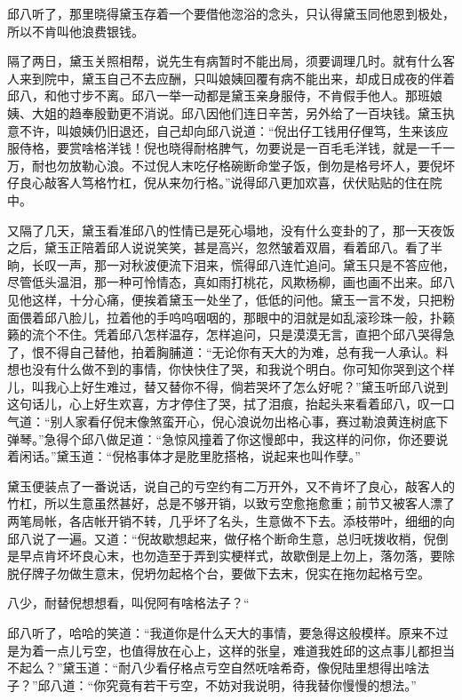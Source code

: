 \documentclass[12pt,UTF8]{ctexbook}
\begin{document}
{{{邱八听了，那里晓得黛玉存着一个要借他淴浴的念头，只认得黛玉同他恩到极处，所以不肯叫他浪费银钱。

隔了两日，黛玉关照相帮，说先生有病暂时不能出局，须要调理几时。就有什么客人来到院中，黛玉自己不去应酬，只叫娘姨回覆有病不能出来，却成日成夜的伴着邱八，和他寸步不离。邱八一举一动都是黛玉亲身服侍，不肯假手他人。那班娘姨、大姐的趋奉殷勤更不消说。邱八因他们连日辛苦，另外给了一百块钱。黛玉执意不许，叫娘姨仍旧退还，自己却向邱八说道：“倪出仔工钱用仔俚笃，生来该应服侍格，要赏啥格洋钱！倪也晓得耐格脾气，勿要说是一百毛毛洋钱，就是一千一万，耐也勿放勒心浪。不过倪人末吃仔格碗断命堂子饭，倒勿是格号坏人，要倪坏仔良心敲客人笃格竹杠，倪从来勿行格。”说得邱八更加欢喜，伏伏贴贴的住在院中。

又隔了几天，黛玉看准邱八的性情已是死心塌地，没有什么变卦的了，那一天夜饭之后，黛玉正陪着邱人说说笑笑，甚是高兴，忽然皱着双眉，看着邱八。看了半晌，长叹一声，那一对秋波便流下泪来，慌得邱八连忙追问。黛玉只是不答应他，尽管低头温泪，那一种可怜情态，真如雨打桃花，风欺杨柳，画也画不出来。邱八见他这样，十分心痛，便挨着黛玉一处坐了，低低的问他。黛玉一言不发，只把粉面偎着邱八脸儿，拉着他的手呜呜咽咽的，那眼中的泪就是如乱滚珍珠一般，扑籁籁的流个不住。凭着邱八怎样温存，怎样追问，只是漠漠无言，直把个邱八哭得急了，恨不得自己替他，拍着胸脯道：“无论你有天大的为难，总有我一人承认。料想也没有什么做不到的事情，你快快住了哭，和我说个明白。你可知你哭到这个样儿，叫我心上好生难过，替又替你不得，倘若哭坏了怎么好呢？”黛玉听邱八说到这句话儿，心上好生欢喜，方才停住了哭，拭了泪痕，抬起头来看着邱八，叹一口气道：“别人家看仔倪末像煞蛮开心，倪心浪说勿出格心事，赛过勒浪黄连树底下弹琴。”急得个邱八做足道：“急惊风撞着了你这慢郎中，我这样的问你，你还要说着闲话。”黛玉道：“倪格事体才是肐里肐搭格，说起来也叫作孽。”

黛玉便装点了一番说话，说自己的亏空约有二万开外，又不肯坏了良心，敲客人的竹杠，所以生意虽然甚好，总是不够开销，以致亏空愈拖愈重；前节又被客人漂了两笔局帐，各店帐开销不转，几乎坏了名头，生意做不下去。添枝带叶，细细的向邱八说了一遍。又道：“倪故歇想起来，做仔格个断命生意，总归呒拨收梢，倪倒是早点肯坏坏良心末，也勿造至于弄到实梗样式，故歇倒是上勿上，落勿落，要除脱仔牌子勿做生意末，倪坍勿起格个台，要做下去末，倪实在拖勿起格亏空。

八少，耐替倪想想看，叫倪阿有啥格法子？“

邱八听了，哈哈的笑道：“我道你是什么天大的事情，要急得这般模样。原来不过是为着一点儿亏空，也值得放在心上，这样的张皇，难道我姓邱的这点事儿都担当不起么？”黛玉道：“耐八少看仔格点亏空自然呒啥希奇，像倪陆里想得出啥法子？”邱八道：“你究竟有若干亏空，不妨对我说明，待我替你慢慢的想法。”

}}}
\end{document}
